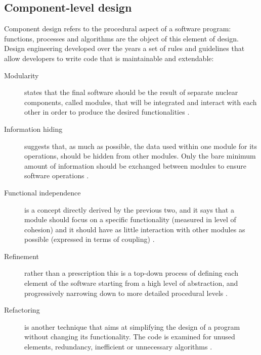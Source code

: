 \subsection{Component-level design}
Component design refers to the procedural aspect of a software program:
functions, processes and algorithms are the object of this element of design.
Design engineering developed over the years a set of rules and guidelines that
allow developers to write code that is maintainable and extendable:
\begin{description}
\item [Modularity] states that the final software should be the result of
separate nuclear components, called modules, that will be integrated and
interact with each other in order to produce the desired functionalities
\cite{GM78}.
\item [Information hiding] suggests that, as much as possible, the data used
within one module for its operations, should be hidden from other modules. Only
the bare minimum amount of information should be exchanged between modules to
ensure software operations \cite{DP72}.
\item [Functional independence] is a concept directly derived by the previous
two, and it says that a module should focus on a specific functionality
(measured in level of cohesion) and it should have as little interaction with
other modules as possible (expressed in terms of coupling) \cite{DP72}.
\item [Refinement] rather than a prescription this is a top-down process of
defining each element of the software starting from a high level of abstraction,
and progressively narrowing down to more detailed procedural levels \cite{NW71}.
\item [Refactoring] is another technique that aims at simplifying the design
of a program without changing its functionality. The code is examined for
unused elements, redundancy, inefficient or unnecessary algorithms \cite{RP05}.
\end{description}

